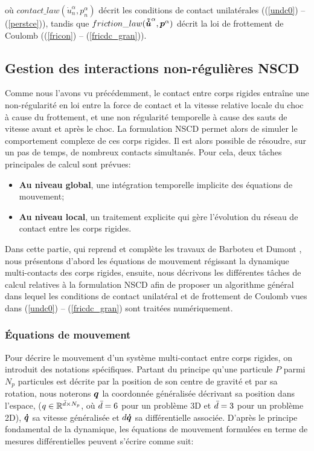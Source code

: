 \noindent où $contact\_law(\dot{u}_{n}^{\alpha},p_{n}^{\alpha})$ décrit les conditions de contact unilatérales ((\ref{undc0}) -- (\ref{perstce})), tandis que $friction\_law(\boldsymbol{\tilde{\dot{u}}}^{\alpha},\boldsymbol{p}^{\alpha})$ décrit la loi de frottement de Coulomb ((\ref{fricon}) -- (\ref{fricdc_gran})).

\subsection{Gestion des interactions non-régulières NSCD}

Comme nous l'avons vu précédemment, le contact entre corps rigides entraîne une non-régularité en loi entre la force de contact et la vitesse relative locale du choc à cause du frottement, et une non régularité temporelle à cause des sauts de vitesse avant et après le choc. La formulation NSCD permet alors de simuler le comportement complexe de ces corps rigides. Il est alors possible de résoudre, sur un pas de temps, de
nombreux contacts simultanés. Pour cela, deux tâches principales de calcul sont prévues:

\begin{itemize}
    \item \textbf{Au niveau global}, une intégration temporelle implicite des équations de mouvement;
    \item \textbf{Au niveau local}, un traitement explicite qui gère l’évolution du réseau de contact entre les corps rigides.
\end{itemize}

Dans cette partie, qui reprend et complète les travaux de Barboteu et Dumont \cite{barboteu2018primal}, nous présentons d'abord les équations de mouvement régissant la dynamique multi-contacts des corps rigides, ensuite, nous décrivons les différentes tâches de calcul relatives à la formulation NSCD afin de proposer un algorithme général dans lequel les conditions de contact unilatéral et de frottement de Coulomb vues dans (\ref{undc0}) -- (\ref{fricdc_gran}) sont traitées numériquement.

\subsubsection{Équations de mouvement}

Pour décrire le mouvement d'un système multi-contact entre corps rigides, on introduit des notations spécifiques. Partant du principe qu'une particule $P$ parmi $N_p$ particules est décrite par la position de son centre de gravité et par sa rotation, nous noterons $\boldsymbol{q}$ la coordonnée généralisée décrivant sa position dans l'espace, ($q \in \mathbb{R}^{\Bar{d} \times N_p}$, où $\Bar{d} = 6$ pour un problème 3D et $\Bar{d} = 3$ pour un problème 2D), $\boldsymbol{\dot{q}}$ sa vitesse généralisée et $d\boldsymbol{\dot{q}}$ sa différentielle associée. D'après le principe fondamental de la dynamique, les équations de mouvement formulées en terme de mesures différentielles peuvent s'écrire comme suit:

